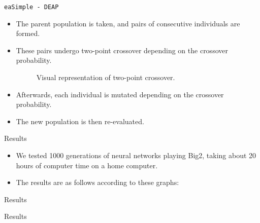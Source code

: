\documentclass{beamer}
\begin{document}
\begin{frame}{\texttt{eaSimple - DEAP}}
	
	\begin{itemize}
		\item The parent population is taken, and pairs of consecutive individuals are formed.
		\item These pairs undergo two-point crossover depending on the crossover probability.
		\begin{figure}[h]
			
			\caption{Visual representation of two-point crossover.}
			\centering
		\end{figure}
		\item Afterwards, each individual is mutated depending on the crossover probability.
		\item The new population is then re-evaluated.
	\end{itemize}
\end{frame}
\begin{frame}{Results}
	
	\begin{itemize}
		\item We tested 1000 generations of neural networks playing Big2, taking about 20 hours of computer time on a home computer.
		\item The results are as follows according to these graphs:
	\end{itemize}
	
\end{frame}

\begin{frame}{Results}
\end{frame}

\begin{frame}{Results}
\end{frame}
\end{document}
